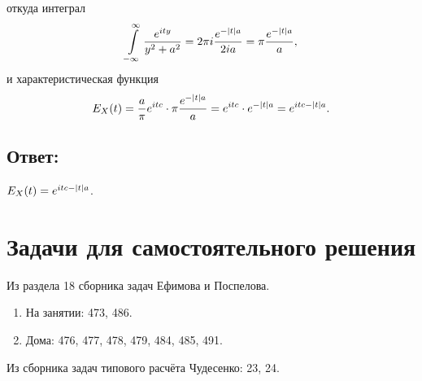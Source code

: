 откуда интеграл
\begin{equation}
    \int \limits_{-\infty}^\infty \frac{e^{ity}}{y^2 + a^2}
    = 2 \pi i \frac{e^{- \left | t \right | a}}{2 i a}
    = \pi \frac{e^{- \left | t \right | a}}{a},
\end{equation}
и характеристическая функция
\begin{equation}
    E_X(t)
    = \frac{a}{\pi} e^{itc} \cdot \pi \frac{e^{- \left | t \right | a}}{a}
    = e^{itc} \cdot e^{- \left | t \right | a}
    = e^{itc - \left | t \right | a} .
\end{equation}

\subsection*{Ответ:}
$E_X(t) = e^{itc - \left | t \right | a}$.

\section*{Задачи для самостоятельного решения}

Из раздела 18 сборника задач Ефимова и Поспелова.
\begin{enumerate}
    \item На занятии: 473, 486.
    \item Дома: 476, 477, 478, 479, 484, 485, 491.
\end{enumerate}

Из сборника задач типового расчёта Чудесенко: 23, 24.